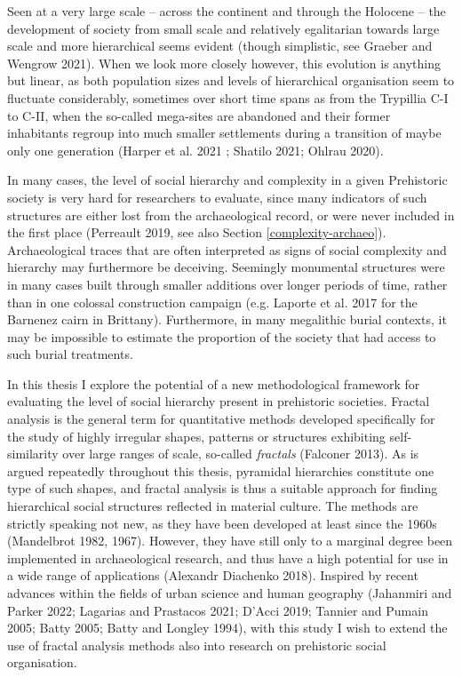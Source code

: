 \documentclass[
  12pt,
  a4paper, twoside]{book}
\begin{document}
Seen at a very large scale -- across the continent and through the Holocene -- the development of society from small scale and relatively egalitarian towards large scale and more hierarchical seems evident (though simplistic, see Graeber and Wengrow 2021). When we look more closely however, this evolution is anything but linear, as both population sizes and levels of hierarchical organisation seem to fluctuate considerably, sometimes over short time spans as from the Trypillia C-I to C-II, when the so-called mega-sites are abandoned and their former inhabitants regroup into much smaller settlements during a transition of maybe only one generation (Harper et al. 2021 ; Shatilo 2021; Ohlrau 2020).

In many cases, the level of social hierarchy and complexity in a given Prehistoric society is very hard for researchers to evaluate, since many indicators of such structures are either lost from the archaeological record, or were never included in the first place (Perreault 2019, see also Section \ref{complexity-archaeo}). Archaeological traces that are often interpreted as signs of social complexity and hierarchy may furthermore be deceiving. Seemingly monumental structures were in many cases built through smaller additions over longer periods of time, rather than in one colossal construction campaign (e.g. Laporte et al. 2017 for the Barnenez cairn in Brittany). Furthermore, in many megalithic burial contexts, it may be impossible to estimate the proportion of the society that had access to such burial treatments.

In this thesis I explore the potential of a new methodological framework for evaluating the level of social hierarchy present in prehistoric societies. Fractal analysis is the general term for quantitative methods developed specifically for the study of highly irregular shapes, patterns or structures exhibiting self-similarity over large ranges of scale, so-called \emph{fractals} (Falconer 2013). As is argued repeatedly throughout this thesis, pyramidal hierarchies constitute one type of such shapes, and fractal analysis is thus a suitable approach for finding hierarchical social structures reflected in material culture. The methods are strictly speaking not new, as they have been developed at least since the 1960s (Mandelbrot 1982, 1967). However, they have still only to a marginal degree been implemented in archaeological research, and thus have a high potential for use in a wide range of applications (Alexandr Diachenko 2018). Inspired by recent advances within the fields of urban science and human geography (Jahanmiri and Parker 2022; Lagarias and Prastacos 2021; D'Acci 2019; Tannier and Pumain 2005; Batty 2005; Batty and Longley 1994), with this study I wish to extend the use of fractal analysis methods also into research on prehistoric social organisation.
\end{document}
